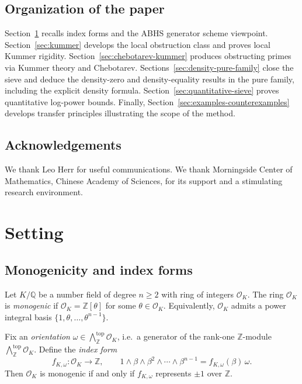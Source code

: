 \documentclass[11pt,letterpaper]{amsart}
\newcommand{\Z}{\mathbb{Z}}
\newcommand{\Q}{\mathbb{Q}}
\newcommand{\wedgeTop}{\bigwedge\nolimits^{\mathrm{top}}}
\newcommand{\OO}{\mathcal{O}}
\theoremstyle{plain}
\theoremstyle{definition}
\theoremstyle{remark}
\theoremstyle{plain}
\begin{document}
\subsection*{Organization of the paper}

Section~\ref{sec:setting} recalls index forms and the ABHS generator scheme viewpoint.
Section~\ref{sec:kummer} develops the local obstruction class and proves local Kummer rigidity.
Section~\ref{sec:chebotarev-kummer} produces obstructing primes via Kummer theory and Chebotarev.
Sections~\ref{sec:density-pure-family} close the sieve and deduce the density-zero
and density-equality results in the pure family, including the explicit density formula.
Section~\ref{sec:quantitative-sieve} proves quantitative log-power bounds.
Finally, Section~\ref{sec:examples-counterexamples} develops transfer principles illustrating the scope of the method.

\subsection*{Acknowledgements}
We thank Leo Herr for useful communications. We thank Morningside Center of Mathematics, Chinese Academy of Sciences, for its support and a stimulating research environment.
\section{Setting}\label{sec:setting}

\subsection{Monogenicity and index forms}
Let $K/\Q$ be a number field of degree $n\ge 2$ with ring of integers $\OO_K$.
The ring $\OO_K$ is \emph{monogenic} if $\OO_K=\Z[\theta]$ for some $\theta\in\OO_K$. Equivalently, $\OO_K$ admits a power integral basis $\{1,\theta,\dots,\theta^{n-1}\}$.

Fix an \emph{orientation} $\omega\in \wedgeTop_\Z \OO_K$, i.e.\ a generator of the rank-one
$\Z$-module $\wedgeTop_\Z \OO_K$. Define the \emph{index form}
\begin{equation}\label{eq:index-form-classical}
f_{K,\omega}:\OO_K\longrightarrow \Z,\qquad
1\wedge \beta\wedge \beta^2\wedge \cdots \wedge \beta^{n-1} = f_{K,\omega}(\beta)\,\omega.
\end{equation}
Then $\OO_K$ is monogenic if and only if $f_{K,\omega}$ represents $\pm 1$ over $\Z$. 
\end{document}
